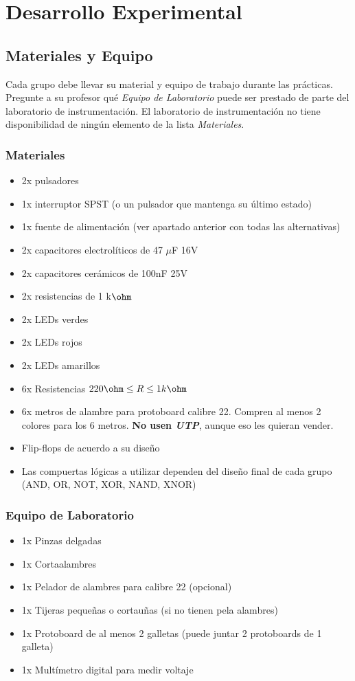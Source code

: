 
\section{Desarrollo Experimental}
\subsection{Materiales y Equipo}

Cada grupo debe llevar su material y equipo de trabajo durante las prácticas. Pregunte a su profesor qué \emph{Equipo de Laboratorio} puede ser prestado
de parte del laboratorio de instrumentación. El laboratorio de instrumentación no tiene disponibilidad de ningún elemento de la lista \emph{Materiales}.

\subsubsection*{Materiales}
\begin{itemize}
    \item 2x pulsadores
    \item 1x interruptor SPST (o un pulsador que mantenga su último estado)
    \item 1x fuente de alimentación (ver apartado anterior con todas las alternativas)
    \item 2x capacitores electrolíticos de 47 $\mu$F 16V
    \item 2x capacitores cerámicos de 100nF 25V
    \item 2x resistencias de 1 k$\ohm$
    \item 2x LEDs verdes
    \item 2x LEDs rojos
    \item 2x LEDs amarillos
    \item 6x Resistencias $220 \ohm \leq R \leq 1 k\ohm$
    \item 6x metros de alambre para protoboard calibre 22. Compren al menos 2 colores para los 6 metros. \textbf{No usen \emph{UTP}}, aunque eso les quieran vender.
    \item Flip-flops de acuerdo a su diseño 
    \item Las compuertas lógicas a utilizar dependen del diseño final de cada grupo (AND, OR, NOT, XOR, NAND, XNOR)
\end{itemize}


\subsubsection*{Equipo de Laboratorio}
\begin{itemize}
    \item 1x Pinzas delgadas
    \item 1x Cortaalambres
    \item 1x Pelador de alambres para calibre 22 (opcional)
    \item 1x Tijeras pequeñas o cortauñas (si no tienen pela alambres)
    \item 1x Protoboard de al menos 2 galletas (puede juntar 2 protoboards de 1 galleta)
    \item 1x Multímetro digital para medir voltaje
\end{itemize}

